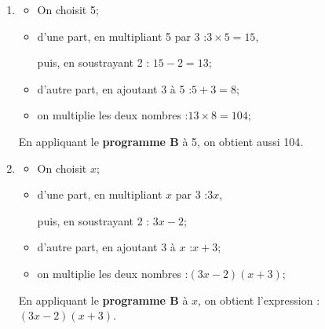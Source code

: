\begin{enumerate}
\begin{itemize}
		\item d'une part, le carré de $x$ est :\quad $x^2$;

		puis, en multipliant ceci par 3 :\quad $3x^2$;

		\item d'autre part, en multipliant $x$ par 7 :\quad $7x$;

		\item on additionne les deux nombres :\quad $3x^2+7x$;

		\item Finalement, on soustrait 6 :\quad $3x^2+7x-6$.
	\end{itemize}

	Avec $x$ comme nombre de départ, une expression littérale du \textbf{programme A} en fonction de $x$ est:\quad $3x^2+7x-6$

	\item \begin{itemize}
		\item On choisit 5;

		\item d'une part, en multipliant 5 par 3 :\quad $3 \times 5 = 15$,

		puis, en soustrayant 2 : \quad $15 - 2 = 13$;

		\item d'autre part, en ajoutant 3 à 5 :\quad $5+3=8$;

		\item on multiplie les deux nombres :\quad $13 \times 8 = 104$;
	\end{itemize}

	En appliquant le \textbf{programme B} à 5, on obtient aussi 104.

	\item \begin{itemize}
		\item On choisit $x$;

		\item d'une part, en multipliant $x$ par 3 :\quad $3x$,

		puis, en soustrayant 2 : \quad $3x-2$;

		\item d'autre part, en ajoutant 3 à $x$ :\quad $x+3$;

		\item on multiplie les deux nombres :\quad $(3x-2)(x+3)$;
	\end{itemize}

	En appliquant le \textbf{programme B} à $x$, on obtient l'expression :\quad $(3x-2)(x+3)$.


\end{enumerate}
